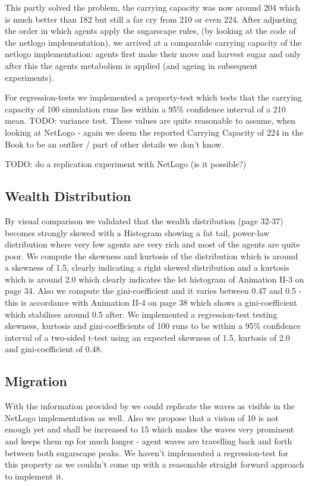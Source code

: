 This partly solved the problem, the carrying capacity was now around 204 which is much better than 182 but still a far cry from 210 or even 224. After adjusting the order in which agents apply the sugarscape rules, (by looking at the code of the netlogo implementation), we arrived at a comparable carrying capacity of the netlogo implementation: agents first make their move and harvest sugar and only after this the agents metabolism is applied (and ageing in subsequent experiments).

For regression-tests we implemented a property-test which tests that the carrying capacity of 100 simulation runs lies within a 95\% confidence interval of a 210 mean. TODO: variance test. These values are quite reasonable to assume, when looking at NetLogo - again we deem the reported Carrying Capacity of 224 in the Book to be an outlier / part of other details we don't know.

TODO: do a replication experiment with NetLogo (is it possible?)

\subsection{Wealth Distribution}
By visual comparison we validated that the wealth distribution (page 32-37) becomes strongly skewed with a Histogram showing a fat tail, power-law distribution where very few agents are very rich and most of the agents are quite poor. We compute the skewness and kurtosis of the distribution which is around a skewness of 1.5, clearly indicating a right skewed distribution and a kurtosis which is around 2.0 which clearly indicates the lst histogram of Animation II-3 on page 34. Also we compute the gini-coefficient and it varies between 0.47 and 0.5 - this is accordance with Animation II-4 on page 38 which shows a gini-coefficient which stabilises around 0.5 after. 
We implemented a regression-test testing skewness, kurtosis and gini-coefficients of 100 runs to be within a 95\% confidence interval of a two-sided t-test using an expected skewness of 1.5, kurtosis of 2.0 and gini-coefficient of 0.48.

\subsection{Migration}
With the information provided by \cite{weaver_replicating_nodate} we could replicate the waves as visible in the NetLogo implementation as well. Also we propose that a vision of 10 is not enough yet and shall be increased to 15 which makes the waves very prominent and keeps them up for much longer - agent waves are travelling back and forth between both sugarscape peaks. We haven't implemented a regression-test for this property as we couldn't come up with a reasonable straight forward approach to implement it.

